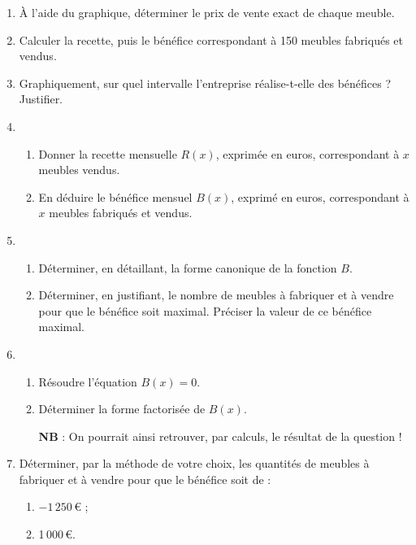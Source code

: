 \documentclass[a4paper,11pt]{article}
\begin{document}
\begin{enumerate}
	\item À l’aide du graphique, déterminer le prix de vente exact de chaque meuble.
	\item Calculer la recette, puis le bénéfice correspondant à 150 meubles fabriqués et vendus.
	\item Graphiquement, sur quel intervalle l’entreprise réalise-t-elle des bénéfices ? Justifier.
	\item 
	\begin{enumerate}
		\item Donner la recette mensuelle $R(x)$, exprimée en euros, correspondant à $x$ meubles vendus.
		\item En déduire le bénéfice mensuel $B(x)$, exprimé en euros, correspondant à $x$ meubles fabriqués et vendus.
	\end{enumerate}
	\item
	\begin{enumerate}
		\item Déterminer, en détaillant, la forme canonique de la fonction $B$.
		\item Déterminer, en justifiant, le nombre de meubles à fabriquer et à vendre pour que le bénéfice soit maximal. Préciser la valeur de ce bénéfice maximal.
	\end{enumerate}
	\item 
	\begin{enumerate}
		\item Résoudre l'équation $B(x)=0$.
		\item Déterminer la forme factorisée de $B(x)$.
		
		\textbf{NB} : On pourrait ainsi retrouver, par calculs, le résultat de la question  !
	\end{enumerate}
	\item Déterminer, par la méthode de votre choix, les quantités de meubles à fabriquer et à vendre pour que le bénéfice soit de :
	\begin{enumerate}
		\item $-1\,250$\,€ ;
		\item 1\,000\,€.
	\end{enumerate}
\end{enumerate}
\end{document}
